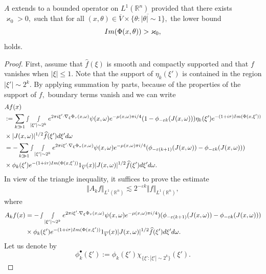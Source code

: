 \documentclass[10pt,a4paper]{amsart}
\begin{document}
\begin{lemma}\label{boundedness:A}
    $A$ extends to a bounded operator on $L^1(\mathbb{R}^n)$ provided that there exists $\varkappa_0>0,$ such that for all $(x,\theta)\in \overline{V}\times \overline{\{\theta: |\theta|\sim 1\}},$ the lower bound $$\textnormal{Im}(\Phi(x,\theta))>\varkappa_0,$$ holds.
\end{lemma}

\begin{proof}First, assume that $\widehat{f}(\xi)$ is smooth and compactly supported and that $f$ vanishes when $|\xi|\leq 1.$ Note that the support of $\eta_{k}(\xi')$ is contained in the region $|\xi'|\sim 2^ k.$
By applying summation by parts, because of the properties of the support of $f,$ boundary terms vanish and we can write
\begin{align*}
  &Af(x)\\
  &:= \sum_{k\gg 1}\smallint\smallint_{|\xi'|\sim 2^ k} e^{2\pi i\xi'\cdot \nabla_\xi\Phi_\tau(x,\omega)}\psi(x,\omega)e^{-\mu(x,\omega)\pi i/4} (1-\phi_{-\varepsilon k}(J(x,\omega)))\eta_{k}(\xi')e^{-(1+i\tau)\textnormal{Im}(\Phi(x,\xi'))}\\
&\times |J(x,\omega)|^{1/2}\widehat{f}(\xi')d\xi'd\omega\\
&=- \sum_{k\gg 1}\smallint\smallint_{|\xi'|\sim 2^ k} e^{2\pi i\xi'\cdot \nabla_\xi\Phi_\tau(x,\omega)}\psi(x,\omega)e^{-\mu(x,\omega)\pi i/4} (\phi_{-\varepsilon (k+1)}(J(x,\omega))-\phi_{-\varepsilon k}(J(x,\omega)))\\
&\times \phi_{k}(\xi')e^{-(1+i\tau)\textnormal{Im}(\Phi(x,\xi'))} 1_{\overline{V}}(x)|J(x,\omega)|^{1/2}\widehat{f}(\xi')d\xi'd\omega.
\end{align*}
In view of the triangle inequality, it suffices to prove  the estimate
\begin{equation}
    \Vert A_k f\Vert_{L^1(\mathbb{R}^n)}\lesssim 2^{-\varepsilon k}\Vert f\Vert_{L^1(\mathbb{R}^n)},
\end{equation} where 
\begin{align*}
    A_kf(x)&=- \smallint\smallint_{|\xi'|\sim 2^ k} e^{2\pi i\xi'\cdot \nabla_\xi\Phi_\tau(x,\omega)}\psi(x,\omega)e^{-\mu(x,\omega)\pi i/4}) (\phi_{-\varepsilon (k+1)}(J(x,\omega))-\phi_{-\varepsilon k}(J(x,\omega)))\\
&\times \phi_{k}(\xi')e^{-(1+i\tau)\textnormal{Im}(\Phi(x,\xi'))} 1_{\overline{V}}(x) |J(x,\omega)|^{1/2}\widehat{f}(\xi')d\xi'd\omega. 
\end{align*}
Let us denote by $$\phi_k^\bullet(\xi'):=\phi_k(\xi')\chi_{ \{\xi': |\xi'|\sim 2^k\} }(\xi').$$

\end{proof}
\end{document}

